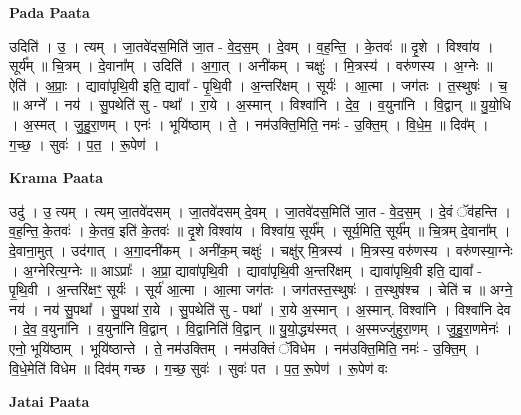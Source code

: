 \documentclass[17pt]{extarticle}
\begin{document}
\textbf{Pada Paata} \newline

उदिति॑ । उ॒ । त्यम् । जा॒तवे॑दस॒मिति॑ जा॒त - वे॒द॒स॒म् । दे॒वम् । व॒ह॒न्ति॒ । के॒तवः॑ ॥ दृ॒शे । विश्वा॑य । सूर्य᳚म् ॥ चि॒त्रम् । दे॒वाना᳚म् । उदिति॑ । अ॒गा॒त् । अनी॑कम् । चक्षुः॑ । मि॒त्रस्य॑ । वरु॑णस्य । अ॒ग्नेः ॥ ऐति॑ । अ॒प्राः॒ । द्यावा॑पृथि॒वी इति॒ द्यावा᳚ - पृ॒थि॒वी । अ॒न्तरि॑क्षम् । सूर्यः॑ । आ॒त्मा । जग॑तः । त॒स्थुषः॑ । च॒ ॥ अग्ने᳚ । नय॑ । सु॒पथेति॑ सु - पथा᳚ । रा॒ये । अ॒स्मान् । विश्वा॑नि । दे॒व॒ । व॒युना॑नि । वि॒द्वान् ॥ यु॒यो॒धि । अ॒स्मत् । जु॒हु॒रा॒णम् । एनः॑ । भूयि॑ष्ठाम् । ते॒ । नम॑उक्ति॒मिति॒ नमः॑ - उ॒क्ति॒म् । वि॒धे॒म॒ ॥ दिव᳚म् । ग॒च्छ॒ । सुवः॑ । प॒त॒ । रू॒पेण॑ ।  \newline


\textbf{Krama Paata} \newline

उदु॑ । उ॒ त्यम् । त्यम् जा॒तवे॑दसम् । जा॒तवे॑दसम् दे॒वम् । जा॒तवे॑दस॒मिति॑ जा॒त - वे॒द॒स॒म् । दे॒वं ॅव॑हन्ति । व॒ह॒न्ति॒ के॒तवः॑ । के॒तव॒ इति॑ के॒तवः॑ ॥ दृ॒शे विश्वा॑य । विश्वा॑य॒ सूर्य᳚म् । सूर्य॒मिति॒ सूर्य᳚म् ॥ चि॒त्रम् दे॒वाना᳚म् । दे॒वाना॒मुत् । उद॑गात् । अ॒गा॒दनी॑कम् । अनी॑क॒म् चक्षुः॑ । चक्षु॑र् मि॒त्रस्य॑ । मि॒त्रस्य॒ वरु॑णस्य । वरु॑णस्या॒ग्नेः । अ॒ग्नेरित्य॒ग्नेः ॥ आऽप्राः᳚ । अ॒प्रा॒ द्यावा॑पृथि॒वी । द्यावा॑पृथि॒वी अ॒न्तरि॑क्षम् । द्यावा॑पृथि॒वी इति॒ द्यावा᳚ - पृ॒थि॒वी । अ॒न्तरि॑क्षꣳ॒॒ सूर्यः॑ । सूर्य॑ आ॒त्मा । आ॒त्मा जग॑तः । जग॑तस्त॒स्थुषः॑ । त॒स्थुष॑श्च । चेति॑ च ॥ अग्ने॒ नय॑ । नय॑ सु॒पथा᳚ । सु॒पथा॑ रा॒ये । सु॒पथेति॑ सु - पथा᳚ । रा॒ये अ॒स्मान् । अ॒स्मान्. विश्वा॑नि । विश्वा॑नि देव । दे॒व॒ व॒युना॑नि । व॒युना॑नि वि॒द्वान् । वि॒द्वानिति॑ वि॒द्वान् ॥ यु॒यो॒द्ध्य॑स्मत् । अ॒स्मज्जु॑हुरा॒णम् । जु॒हु॒रा॒णमेनः॑ । एनो॒ भूयि॑ष्ठाम् । भूयि॑ष्ठान्ते । ते॒ नम॑उक्तिम् । नम॑उक्तिं ॅविधेम । नम॑उक्ति॒मिति॒ नमः॑ - उ॒क्ति॒म् । वि॒धे॒मेति॑ विधेम ॥ दिव॑म् गच्छ । ग॒च्छ॒ सुवः॑ । सुवः॑ पत । प॒त॒ रू॒पेण॑ । रू॒पेण॑ वः \newline

\textbf{Jatai Paata} \newline
\end{document}
